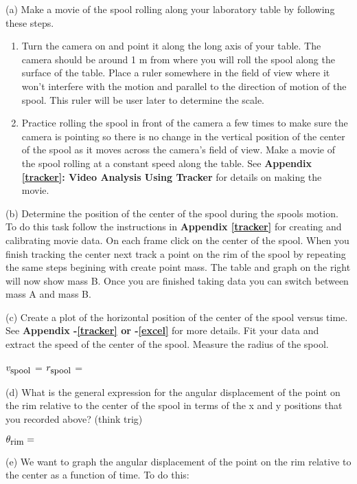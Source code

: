 (a) Make a movie of the spool rolling along your laboratory table by following
these steps. 

\begin{enumerate}
\item Turn the camera on and point it along the long axis of your table. The camera
should be around 1 m from where you will roll the spool along the surface of
the table. Place a ruler somewhere in the field of view where it won't interfere
with the motion and parallel to the direction of motion of the spool. This ruler will
be user later to determine the scale. 
\item Practice rolling the spool in front of the camera a few times to make sure the
camera is pointing so there is no change in the vertical position of the center
of the spool as it moves across the camera's field of view. Make a movie of
the spool rolling at a constant speed along the table. See \textbf{Appendix
\ref{tracker}: Video Analysis Using Tracker} for details on making the movie.
\end{enumerate}
(b) Determine the position of the center of the spool during the spools motion.  To do this task follow the instructions in \textbf{Appendix
\ref{tracker}} for creating and calibrating movie data. On each frame click on the center of the spool. 
When you finish tracking the center next track a point on the rim of the spool by repeating the same steps begining with create point mass.  The table and graph on the right will now show mass B.  Once you are finished taking data you can switch between mass A and mass B.

(c) Create a plot of the horizontal position of the center of the spool versus
time. See \textbf{Appendix -\ref{tracker} or -\ref{excel}} for more details.
Fit your data and extract the speed of the center of the spool. Measure the radius of the spool.
\vspace{5mm}

\( v_{\mbox{\small spool}} \) = \hfill{}\( r_{\mbox{\small spool}} \) = \hfill{}
\vspace{5mm}

(d) What is the general expression for the angular displacement of the point
on the rim relative to the center of the spool in terms of the x and y positions
that you recorded above? (think trig)
\vspace{5mm}

\( \theta _{\mbox{\small rim}}= \) 
\vspace{5mm}

(e) We want to graph the angular displacement of the point on the rim relative
to the center as a function of time. To do this:

